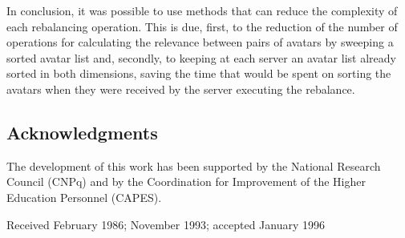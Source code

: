 \documentclass[acmjacm]{acmtrans2m}
\let\mycounter\setcounter
\begin{document}
In conclusion, it was possible to use methods that can reduce the complexity of each rebalancing operation. This is due, first, to the reduction of the number of operations for calculating the relevance between pairs of avatars by sweeping a sorted avatar list and, secondly, to keeping at each server an avatar list already sorted in both dimensions, saving the time that would be spent on sorting the avatars when they were received by the server executing the rebalance.



\subsection{Acknowledgments}

The development of this work has been supported by the National Research Council (CNPq) and by the Coordination for Improvement of the Higher Education Personnel (CAPES).



\begin{received}
Received February 1986;
November 1993;
accepted January 1996
\end{received}


\medskip
\end{document}
